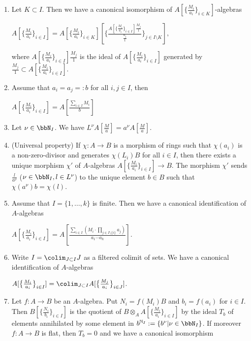 \documentclass[10pt]{alggeom}
\theoremstyle{definition}
\numberwithin{equation}{section}
\begin{document}
\begin{enumerate}
\begin{enumerate}
\end{enumerate}
\item Let $K \subset I$. Then we have a canonical isomorphism of $ A[\big\{ \frac{M_i}{a_i}\big\}_{i \in K}]$-algebras
\begin{center}
$A[\big\{ \frac{M_i}{a_i}\big\}_{i \in I}] = A[\big\{ \frac{M_i}{a_i}\big\}_{i \in K}] [\big\{ \frac{A[\big\{ \frac{M_i}{a_i}\big\}_{i \in I}]\frac{M_j}{1}}{\frac{a_j}{1}}\big\}_{j \in I \setminus K}], $
\end{center}
where ${A[\big\{ \frac{M_i}{a_i}\big\}_{i \in I}]\frac{M_j}{1}}$ is the ideal of $A[\big\{ \frac{M_i}{a_i}\big\}_{i \in I}]$ generated by $\frac{M_j}{1} \subset A[\big\{ \frac{M_i}{a_i}\big\}_{i \in I}]$. 
\item Assume that $a_i=a_j=:b$ for all $i,j \in I$, then 
\begin{center}$A[\big\{ \frac{M_i}{a_i}\big\}_{i \in I}]= A[\frac{\sum _{i\in I}M_i }{b}]$ \end{center}
\item Let $\nu \in \bbN _I$. We have $L^\nu A[\frac{M}{a}] = a^\nu A[\frac{M}{a}]$. 
\item  (Universal property) 
If $\chi : A \to B$ is a morphism of rings such that $\chi (a_i) $ is a non-zero-divisor and generates $\chi (L_i) B$ for all $i\in I$, then there exists a unique morphism $\chi '$ of $A$-algebras $A[\big\{ \frac{M_i}{a_i}\big\}_{i \in I}] \to B$. The morphism $\chi'$ sends $\frac{l}{a^\nu} $ ($\nu \in \bbN _I , l \in L^\nu$) to the unique element $b \in B $ such that $\chi ( a^\nu) b = \chi (l)$.
\item Assume that $I = \{1 , \ldots , k \}$ is finite. Then we have a canonical identification of $A$-algebras
 \begin{center}$A[\big\{ \frac{M_i}{a_i}\big\}_{i \in I}]= A[\frac{\sum _{i \in I} ( M_i \cdot \prod _{j \in I \setminus {\{i\}}} a_j )}{a_1 \cdots a_k}] .$\end{center}
\item Write $I= \colim _{J\subset I } J $ as a filtered colimit of sets. We have a canonical identification of $A$-algebras
\begin{center}
$A[\big\{ \frac{M_i}{a_i}\big\}_{i \in I}] = \colim _{J \subset I} 
A[\big\{ \frac{M_j}{a_i}\big\}_{i \in J}] $.\end{center}
\item Let $f:A \to B$ be an $A$-algebra. Put $N_i=f(M_i) B$ and $b_i = f(a_i)$ for $i \in I$. Then $B [\big\{ \frac{N_i}{b_i}\big\}_{i \in I}]$ is the quotient of $B \otimes _{A} A[\big\{ \frac{M_i}{a_i}\big\}_{i \in I}]$ by the ideal $T_b$ of elements annihilated by some element in $b^{\mathbb{N} _I }:= \{b^\nu | \nu \in \bbN _I \}$. If moreover $f:A\to B$ is flat, then $T_b=0$ and we have a canonical isomorphism 

\end{enumerate}
\end{document}
